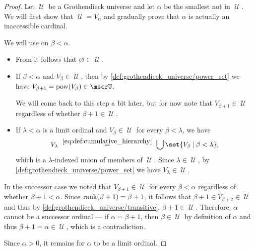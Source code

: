 \begin{proof}
  \NecessitySubProof Let \( \mscrU \) be a Grothendieck universe and let \( \alpha \) be the smallest  not in \( \mscrU \). We will first show that \( \mscrU = V_\alpha \) and gradually prove that \( \alpha \) is actually an inaccessible cardinal.

   We will use  on \( \beta < \alpha \).
  \begin{itemize}
    \item From  it follows that \( \varnothing \in \mscrU \).

    \item If \( \beta < \alpha \) and \( V_\beta \in \mscrU \), then by \ref{def:grothendieck_universe/power_set} we have \( V_{\beta + 1} = \pow(V_\beta) \in \mscrU \).

    We will come back to this step a bit later, but for now note that \( V_{\beta + 1} \in \mscrU \) regardless of whether \( \beta + 1 \in \mscrU \).

    \item If \( \lambda < \alpha \) is a limit ordinal and \( V_\beta \in \mscrU \) for every \( \beta < \lambda \), we have
    \begin{equation*}
      V_\lambda
      \reloset {\eqref{eq:def:cumulative_hierarchy}} =
      \bigcup\set{ V_\beta \given \beta < \lambda },
    \end{equation*}
    which is a \( \lambda \)-indexed union of members of \( \mscrU \). Since \( \lambda \in \mscrU \), by \ref{def:grothendieck_universe/power_set} we have \( V_\lambda \in \mscrU \).
  \end{itemize}

   In the successor case we noted that \( V_{\beta + 1} \in \mscrU \) for every \( \beta < \alpha \) regardless of whether \( \beta + 1 < \alpha \). Since \( \operatorname{rank}(\beta + 1) = \beta + 1 \), it follows that \( \beta + 1 \in V_{\beta + 2} \in \mscrU \) and thus by \ref{def:grothendieck_universe/transitive}, \( \beta + 1 \in \mscrU \). Therefore, \( \alpha \) cannot be a successor ordinal --- if \( \alpha = \beta + 1 \), then \( \beta \in \mscrU \) by definition of \( \alpha \) and thus \( \beta + 1 = \alpha \in \mscrU \), which is a contradiction.

  Since \( \alpha > 0 \), it remains for \( \alpha \) to be a limit ordinal.


\end{proof}
